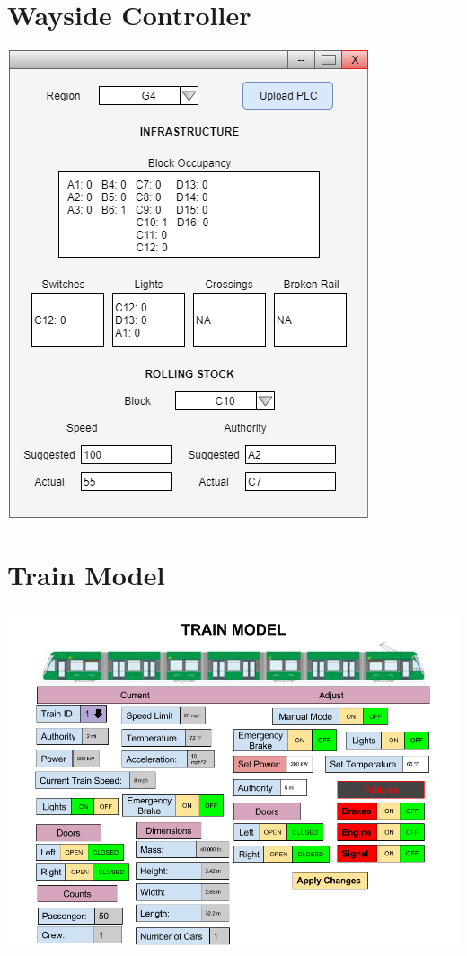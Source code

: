 \documentclass{scrreprt}
\begin{document}
\chapter{Wayside Controller}
\includegraphics[width=\textwidth]{wc-ui}

\chapter{Train Model}
\includegraphics[width=\textwidth]{TrainModelUI}
\end{document}
